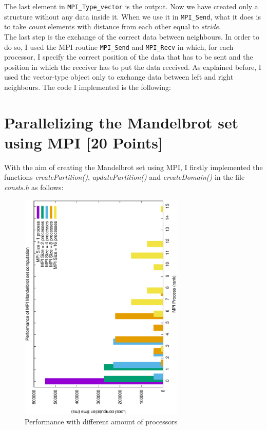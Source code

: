 \documentclass[unicode,11pt,a4paper,oneside,numbers=endperiod,openany]{scrartcl}
\begin{document}
The last element in \texttt{MPI\_Type\_vector} is the output. Now we have created only a structure without any data inside it. When we use it in \texttt{MPI\_Send}, what it does is to take \textit{count} elements with distance from each other equal to \textit{stride}.\\ The last step is the exchange of the correct data between neighbours. In order to do so, I used the MPI routine \texttt{MPI\_Send} and \texttt{MPI\_Recv} in which, for each processor, I specify the correct position of the data that has to be sent and the position in which the receiver has to put the data received. As explained before, I used the vector-type object only to exchange data between left and right neighbours. The code I implemented is the following:\\



\section{Parallelizing the Mandelbrot set using MPI [20 Points]}
With the aim of creating the Mandelbrot set using MPI, I firstly implemented the functions \textit{createPartition()}, \textit{updatePartition()} and \textit{createDomain()} in the file \textit{consts.h} as follows:


\begin{figure}[h!]
	\hspace{-1.5cm}\includegraphics[width=0.7\textwidth, angle=-90]{images/perf.ps}
	\vspace{1cm}
	\caption{Performance with different amount of processors}
	\label{fig:mandelPerf}
\end{figure}
\end{document}
